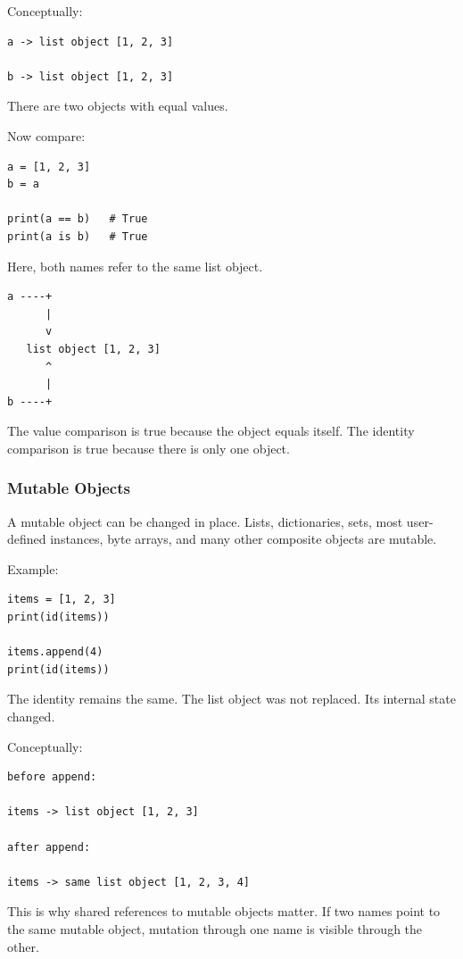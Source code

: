 Conceptually:

\begin{verbatim}
a -> list object [1, 2, 3]

b -> list object [1, 2, 3]
\end{verbatim}

There are two objects with equal values.

Now compare:

\begin{verbatim}
a = [1, 2, 3]
b = a

print(a == b)   # True
print(a is b)   # True
\end{verbatim}

Here, both names refer to the same list object.

\begin{verbatim}
a ----+
      |
      v
   list object [1, 2, 3]
      ^
      |
b ----+
\end{verbatim}

The value comparison is true because the object equals itself. The identity comparison is true because there is only one object.

\subsubsection*{Mutable Objects}

A mutable object can be changed in place. Lists, dictionaries, sets, most user-defined instances, byte arrays, and many other composite objects are mutable.

Example:

\begin{verbatim}
items = [1, 2, 3]
print(id(items))

items.append(4)
print(id(items))
\end{verbatim}

The identity remains the same. The list object was not replaced. Its internal state changed.

Conceptually:

\begin{verbatim}
before append:

items -> list object [1, 2, 3]

after append:

items -> same list object [1, 2, 3, 4]
\end{verbatim}

This is why shared references to mutable objects matter. If two names point to the same mutable object, mutation through one name is visible through the other.

